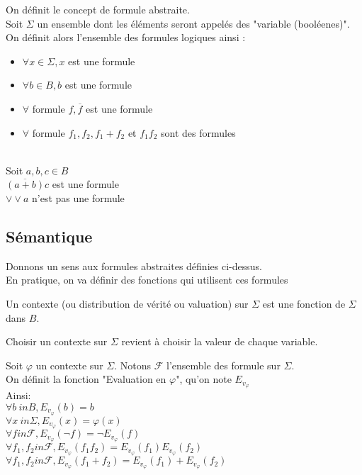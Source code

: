 On définit le concept de formule abstraite.\\
Soit $\Sigma$ un ensemble dont les éléments seront appelés des "variable (booléenes)". On définit alors l'ensemble des formules logiques ainsi :\\

\begin{itemize}
    \item $\forall x \in \Sigma,x$ est une formule
    \item $\forall b \in B,b$ est une formule
    \item $\forall$ formule $f, \overline{f}$ est une formule
    \item $\forall$ formule $f_1,f_2, f_1+f_2$ et $f_1f_2$ sont des formules
\end{itemize}

\begin{ex}\\
    Soit $a,b,c \in B$\\
    $\overline{(a+b)}c$ est une formule\\
    $\lor \lor a$ n'est pas une formule\\
\end{ex} 

\subsection{Sémantique}

Donnons un sens aux formules abstraites définies ci-dessus.\\

En pratique, on va définir des fonctions qui utilisent ces formules

\begin{defi}
    Un contexte (ou distribution de vérité ou valuation) sur $\Sigma$ est une fonction de $\Sigma$ dans $B$.\\
\end{defi}

Choisir un contexte sur $\Sigma$ revient à choisir la valeur de chaque variable.

\begin{defi}
    Soit $\varphi$ un contexte sur $\Sigma$. Notons $\mathcal{F}$ l'ensemble des formule sur $\Sigma$.\\

    On définit la fonction "Evaluation en $\varphi$", qu'on note $E_v_{\varphi}$\\
    Ainsi:\\
    $\forall b \ in B, E_v_{\varphi}(b)=b$ \\
    $\forall x \ in \Sigma, E_v_{\varphi}(x)=\varphi(x)$ \\
    $\forall f in \mathcal{F},E_v_{\varphi}(\lnot f)=\lnot E_v_{\varphi}(f)$ \\
    $\forall f_1,f_2 in \mathcal{F},E_v_{\varphi}(f_1f_2)= E_v_{\varphi}(f_1)E_v_{\varphi}(f_2)$ \\
    $\forall f_1,f_2 in \mathcal{F},E_v_{\varphi}(f_1+f_2)= E_v_{\varphi}(f_1)+E_v_{\varphi}(f_2)$ \\
\end{defi}

